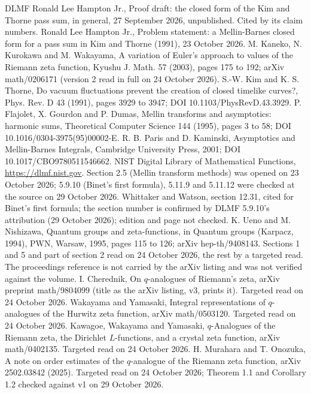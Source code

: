 \documentclass[11pt]{article}
\begin{document}
{\small\sloppy
\begin{thebibliography}{DLMF}
 Ronald Lee Hampton Jr., Proof draft: the closed form of the Kim and Thorne pass sum, in general, 27 September 2026, unpublished. Cited by its claim numbers.
 Ronald Lee Hampton Jr., Problem statement: a Mellin-Barnes closed form for a pass sum in Kim and Thorne (1991), 23 October 2026.
 M. Kaneko, N. Kurokawa and M. Wakayama, A variation of Euler's approach to values of the Riemann zeta function, Kyushu J. Math. 57 (2003), pages 175 to 192; arXiv math/0206171 (version 2 read in full on 24 October 2026).
 S.-W. Kim and K. S. Thorne, Do vacuum fluctuations prevent the creation of closed timelike curves?, Phys. Rev. D 43 (1991), pages 3929 to 3947; DOI 10.1103/PhysRevD.43.3929.
 P. Flajolet, X. Gourdon and P. Dumas, Mellin transforms and asymptotics: harmonic sums, Theoretical Computer Science 144 (1995), pages 3 to 58; DOI 10.1016/0304-3975(95)00002-E.
 R. B. Paris and D. Kaminski, Asymptotics and Mellin-Barnes Integrals, Cambridge University Press, 2001; DOI 10.1017/CBO9780511546662.
 NIST Digital Library of Mathematical Functions, \url{https://dlmf.nist.gov}. Section 2.5 (Mellin transform methods) was opened on 23 October 2026; 5.9.10 (Binet's first formula), 5.11.9 and 5.11.12 were checked at the source on 29 October 2026.
 Whittaker and Watson, section 12.31, cited for Binet's first formula; the section number is confirmed by DLMF 5.9.10's attribution (29 October 2026); edition and page not checked.
 K. Ueno and M. Nishizawa, Quantum groups and zeta-functions, in Quantum groups (Karpacz, 1994), PWN, Warsaw, 1995, pages 115 to 126; arXiv hep-th/9408143. Sections 1 and 5 and part of section 2 read on 24 October 2026, the rest by a targeted read. The proceedings reference is not carried by the arXiv listing and was not verified against the volume.
 I. Cherednik, On $q$-analogues of Riemann's zeta, arXiv preprint math/9804099 (title as the arXiv listing, v3, prints it). Targeted read on 24 October 2026.
 Wakayama and Yamasaki, Integral representations of $q$-analogues of the Hurwitz zeta function, arXiv math/0503120. Targeted read on 24 October 2026.
 Kawagoe, Wakayama and Yamasaki, $q$-Analogues of the Riemann zeta, the Dirichlet $L$-functions, and a crystal zeta function, arXiv math/0402135. Targeted read on 24 October 2026.
 H. Murahara and T. Onozuka, A note on order estimates of the $q$-analogue of the Riemann zeta function, arXiv 2502.03842 (2025). Targeted read on 24 October 2026; Theorem 1.1 and Corollary 1.2 checked against v1 on 29 October 2026.

\end{thebibliography}}
\end{document}
